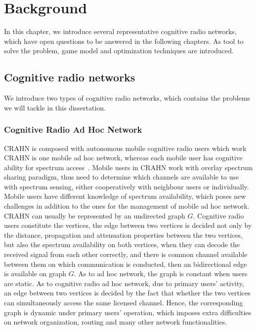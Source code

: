 \chapter{Background}
\label{background}



In this chapter, we introduce several representative cognitive radio networks, which have open questions to be answered in the following chapters.
As tool to solve the problem, game model and optimization techniques are introduced.

\section{Cognitive radio networks}
We introduce two types of cognitive radio networks, which contains the problems we will tackle in this dissertation.

\subsection{Cognitive Radio Ad Hoc Network}


CRAHN is composed with autonomous mobile cognitive radio users which work 
CRAHN is one mobile ad hoc network, whereas each mobile user has cognitive ability for spectrum access~\cite{Akyildiz09}.
Mobile users in CRAHN work with overlay spectrum sharing paradigm, thus need to determine which channels are available to use with spectrum sensing, either cooperatively with neighbour users or individually.
Mobile users have different knowledge of spectrum availability, which poses new challenges in addition to the ones for the management of mobile ad hoc network.
CRAHN can usually be represented by an undirected graph $G$.
Cognitive radio users constitute the vertices, the edge between two vertices is decided not only by the distance, propagation and attenuation properties between the two vertices, but also the spectrum availability on both vertices, \ie when they can decode the received signal from each other correctly, and there is common channel available between them on which communication is conducted, then an bidirectional edge is available on graph $G$.
As to ad hoc network, the graph is constant when users are static.
As to cognitive radio ad hoc network, due to primary users' activity, an edge between two vertices is decided by the fact that whether the two vertices can simultaneously access the same licensed channel.
Hence, the corresponding graph is dynamic under primary users' operation, which imposes extra difficulties on network organization, routing and many other network functionalities.

